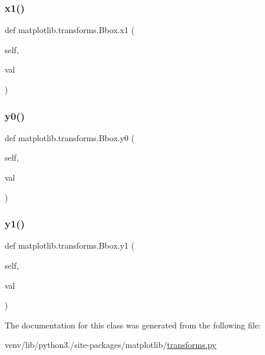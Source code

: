 \subsubsection{\texorpdfstring{x1()}{x1()}}
{\footnotesize\ttfamily def matplotlib.\+transforms.\+Bbox.\+x1 (\begin{DoxyParamCaption}\item[{}]{self,  }\item[{}]{val }\end{DoxyParamCaption})}

\mbox{\label{classmatplotlib_1_1transforms_1_1Bbox_a0bd437549aae55a13e0d43517ecc70f3}} 
\subsubsection{\texorpdfstring{y0()}{y0()}}
{\footnotesize\ttfamily def matplotlib.\+transforms.\+Bbox.\+y0 (\begin{DoxyParamCaption}\item[{}]{self,  }\item[{}]{val }\end{DoxyParamCaption})}

\mbox{\label{classmatplotlib_1_1transforms_1_1Bbox_a0fa7ba7de3a89c6834f94e9df955fd81}} 
\subsubsection{\texorpdfstring{y1()}{y1()}}
{\footnotesize\ttfamily def matplotlib.\+transforms.\+Bbox.\+y1 (\begin{DoxyParamCaption}\item[{}]{self,  }\item[{}]{val }\end{DoxyParamCaption})}



The documentation for this class was generated from the following file\+:\begin{DoxyCompactItemize}
\item 
venv/lib/python3./site-\/packages/matplotlib/\hyperlink{transforms_8py}{transforms.\+py}\end{DoxyCompactItemize}
